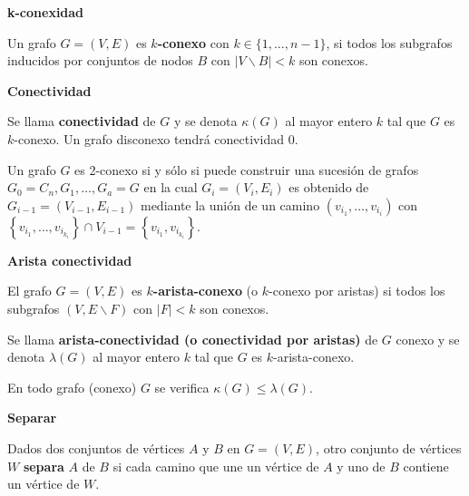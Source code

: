 \documentclass[openany]{book}
\begin{document}
\begin{definition}
  { \color{turquoise} \textbf{k-conexidad}}

  Un grafo $G=(V, E)$ es $k$\textbf{-conexo} con $k \in\{1, \ldots, n-1\}$, si todos los subgrafos inducidos por conjuntos de nodos $B$ con $|V \backslash B|<k$ son conexos.
\end{definition}

\begin{definition}
  { \color{turquoise} \textbf{Conectividad}}


  Se llama \textbf{conectividad} de $G$ y se denota $\kappa(G)$ al mayor entero $k$ tal que $G$ es $k$-conexo. Un grafo disconexo tendrá conectividad $0.$
\end{definition}


\begin{proposition}
  Un grafo $G$ es 2-conexo si y sólo si puede construir una sucesión de grafos $G_{0}=C_{n}, G_{1}, \ldots, G_{a}=G$ en la cual $G_{i}=\left(V_{i}, E_{i}\right)$ es obtenido de $G_{i-1}=\left(V_{i-1}, E_{i-1}\right)$ mediante la unión de un camino $\left(v_{i_{1}}, \ldots, v_{i_{i}}\right)$ con $\left\{v_{i_{1}}, \ldots, v_{i_{k_{i}}}\right\} \cap V_{i-1}=\left\{v_{i_{1}}, v_{i_{k_{i}}}\right\}$.

\end{proposition}


\begin{definition} { \color{turquoise} \textbf{Arista conectividad}}

  El grafo $G=(V, E)$ es $k$\textbf{-arista-conexo} (o $k$-conexo por aristas) si todos los subgrafos $(V, E \backslash F)$ con $|F|<k$ son conexos.

  Se llama \textbf{arista-conectividad (o conectividad por aristas)} de $G$ conexo y se denota $\lambda(G)$ al mayor entero $k$ tal que $G$ es $k$-arista-conexo.

\end{definition}

\begin{proposition}
  En todo grafo (conexo) $G$ se verifica $\kappa(G) \leq \lambda(G)$.
\end{proposition}

\begin{definition}
  { \color{turquoise} \textbf{Separar}}

  Dados dos conjuntos de vértices $A$ y $B$ en $G=(V, E)$, otro conjunto de vértices $W$ \textbf{separa} $A$ de $B$ si cada camino que une un vértice de $A$ y uno de $B$ contiene un vértice de $W$.

\end{definition}
\end{document}
